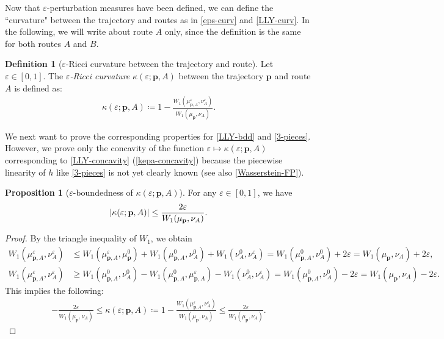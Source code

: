 \documentclass{article}
\numberwithin{equation}{section}
\theoremstyle{definition}
\newtheorem{definition}{Definition}[section]
\newtheorem{proposition}[proposition]{Proposition}
\DeclarePairedDelimiter{\abs}{\lvert}{\rvert}
\newcommand{\eps}{\varepsilon} %
\newcommand{\kepa}{\kappa(\eps;\mathbf{p},A)}
\def\:={\coloneqq} %
\begin{document}
\begin{appendices}
Now that $\eps$-perturbation measures have been defined, we can define the ``curvature" between the trajectory and routes as in \autoref{eps-curv} and \autoref{LLY-curv}.
In the following, we will write about route $A$ only, since the definition is the same for both routes $A$ and $B$.

\begin{definition}[$\eps$-Ricci curvature between the trajectory and route]
Let $\eps\in[0,1]$.
The \emph{$\eps$-Ricci curvature} $\kepa$ between the trajectory $\mathbf{p}$ and route $A$ is defined as: 
\begin{align}
    \kepa \:= 1-\frac{W_1(\mu_{\mathbf{p},A}^\eps,\nu_A^\eps)}{W_1(\mu_\mathbf{p},\nu_A)}. \label{eq:kepa}
\end{align}
\end{definition}

We next want to prove the corresponding properties for \autoref{LLY-bdd} and \autoref{3-pieces}.
However, we prove only the concavity of the function $\eps\mapsto\kepa$ corresponding to \autoref{LLY-concavity} (\autoref{kepa-concavity}) because the piecewise linearity of $h$ like \autoref{3-pieces} is not yet clearly known (see also \autoref{Wasserstein-FP}).

\begin{proposition}[$\eps$-boundedness of $\kepa$] \label{eps-bounded}
For any $\eps\in[0,1]$, we have
\begin{align*}
    \abs{\kepa} \le \frac{2\eps}{W_1(\mu_\mathbf{p},\nu_A)}. 
\end{align*}
\end{proposition}

\begin{proof}
By the triangle inequality of $W_1$, we obtain
\begin{align*}
    W_1(\mu_{\mathbf{p},A}^\eps,\nu_A^\eps) 
    &\le W_1(\mu_{\mathbf{p},A}^\eps,\mu_\mathbf{p}^0) + W_1(\mu_{\mathbf{p},A}^0,\nu_A^0) + W_1(\nu_A^0,\nu_A^\eps)
    = W_1(\mu_{\mathbf{p},A}^0,\nu_A^0) + 2\eps
    = W_1(\mu_\mathbf{p},\nu_A) + 2\eps, \\
    W_1(\mu_{\mathbf{p},A}^\eps,\nu_A^\eps) 
    &\ge W_1(\mu_{\mathbf{p},A}^0,\nu_A^0) - W_1(\mu_{\mathbf{p},A}^0,\mu_{\mathbf{p},A}^\eps) - W_1(\nu_A^0,\nu_A^\eps)
    = W_1(\mu_{\mathbf{p},A}^0,\nu_A^0) - 2\eps
    = W_1(\mu_\mathbf{p},\nu_A) - 2\eps.
\end{align*}
This implies the following:
\begin{align*}
    -\frac{2\eps}{W_1(\mu_\mathbf{p},\nu_A)} \le \kepa 
    \:= 1-\frac{W_1(\mu_{\mathbf{p},A}^\eps,\nu_A^\eps)}{W_1(\mu_\mathbf{p},\nu_A)} \le \frac{2\eps}{W_1(\mu_\mathbf{p},\nu_A)}.
\end{align*}
\end{proof}


\end{appendices}
\end{document}
